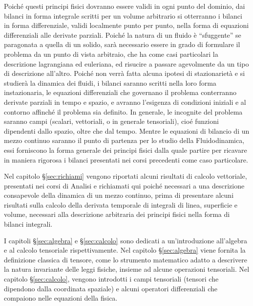 Poiché questi principi fisici dovranno essere validi in ogni punto del dominio, dai bilanci in forma integrale scritti per un volume arbitrario si otterranno i bilanci in forma differenziale, validi localmente punto per punto, nella forma di equazioni differenziali alle derivate parziali.
Poiché la natura di un fluido è ``sfuggente'' se paragonata a quella di un solido, sarà necessario essere in grado di formulare il problema da un punto di vista arbitraio, che ha come casi particolari la descrizione lagrangiana ed euleriana, ed risucire a passare agevolmente da un tipo di descrizione all'altro.
Poiché non verrà fatta alcuna ipotesi di stazionarietà e si studierà la dinamica dei fluidi, i bilanci saranno scritti nella loro forma instazionaria, le equazioni differenziali che governano il problema conterranno derivate parziali in tempo e spazio, e avranno l'esigenza di condizioni iniziali e al contorno affinché il problema sia definito. In generale, le incognite del problema saranno campi (scalari, vettoriali, o in generale tensoriali), cioé funzioni dipendenti dallo spazio, oltre che dal tempo.
\newline \noindent
Mentre le equazioni di bilancio di un mezzo continuo saranno il punto di partenza per lo studio della Fluidodinamica, essi forniscono la forma generale dei principi fisici dalla quale partire per ricavare in maniera rigorosa i bilanci presentati nei corsi precedenti come caso particolare.

\vspace{0.5cm}
Nel capitolo \S\ref{sec:richiami} vengono riportati alcuni risultati di calcolo vettoriale, presentati nei corsi di Analisi e richiamati qui poiché necessari a una descrizione consapevole della dinamica di un mezzo continuo, prima di presentare alcuni risultati sulla calcolo della derivata temporale di integrali di linea, superficie e volume, necessari alla descrizione arbitraria dei principi fisici nella forma di bilanci integrali.

I capitoli \S\ref{sec:algebra} e \S\ref{sec:calcolo} sono dedicati a un'introduzione all'algebra e al calcolo tensoriale rispettivamente. Nel capitolo \S\ref{sec:algebra} viene fornita la definizione classica di tensore, come lo strumento matematico adatto a descrivere la natura invariante delle leggi fisiche, insieme ad alcune operazioni tensoriali. Nel capitolo \S\ref{sec:calcolo}, vengono introdotti i campi tensoriali (tensori che dipendono dalla coordinata spaziale) e alcuni operatori differenziali che compaiono nelle equazioni della fisica.

